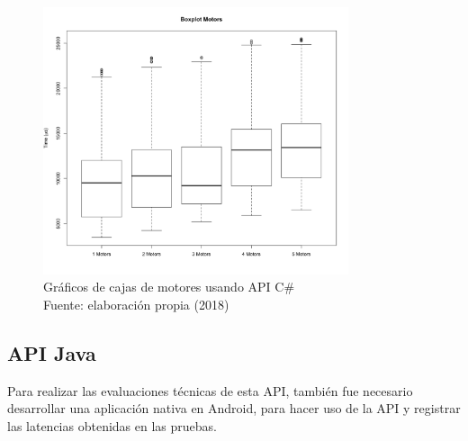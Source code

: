 \begin{figure}[H]
  \begin{center} 
   	\includegraphics[width=0.8\textwidth]{evaluation/graphics/Xamarin/Galaxy-APITest/BoxplotMotorsXamarinGalaxy-APITest.png} 
   	\centering
    \caption[Gráficos de cajas de motores usando API C\# ]{Gráficos de cajas de motores usando API C\# \\Fuente: elaboración propia (2018)} 
    \label{fig:xamarin-galaxy-boxplot-motors-api}
  \end{center}
\end{figure}

\subsection{API Java}
Para realizar las evaluaciones técnicas de esta API, también fue necesario desarrollar una aplicación nativa en Android, para hacer uso de la API y registrar las latencias obtenidas en las pruebas.